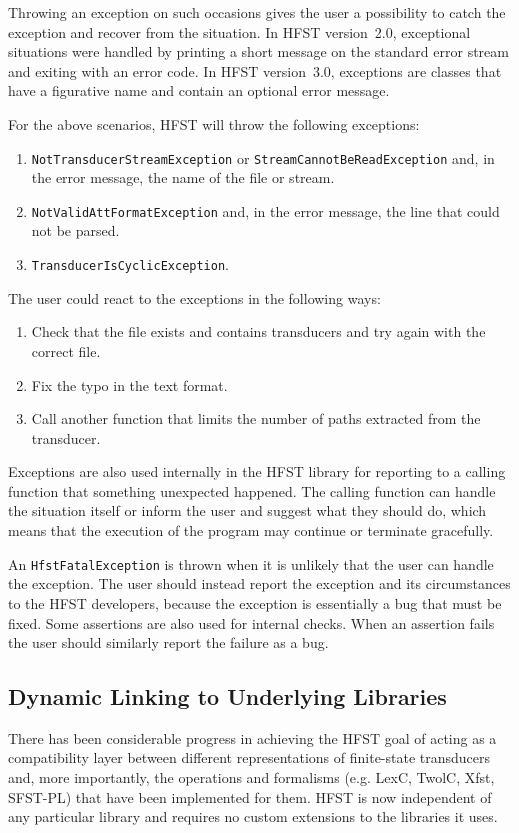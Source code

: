 \documentclass{llncs}
\begin{document}
Throwing an exception on such occasions gives the user a possibility
to catch the exception and recover from the situation. In HFST version~2.0,
exceptional situations were handled by printing a short message
on the standard error stream and exiting with an error code. In HFST version~3.0, 
exceptions are classes that have a figurative name and contain an 
optional error message.

For the above scenarios, HFST will throw the following exceptions:

\begin{enumerate} 
\item \texttt{NotTransducerStreamException} or 
\texttt{StreamCannotBeReadException} and, in the error message,
the name of the file or stream.
\item \texttt{NotValidAttFormatException} and, in the error message, 
the line that could not be parsed.
\item \texttt{TransducerIsCyclicException}.
\end{enumerate} 

The user could react to the exceptions in the following ways:

\begin{enumerate} 
\item Check that the file exists and contains transducers and try again
with the correct file.
\item Fix the typo in the text format.
\item Call another function that limits the number of paths extracted
from the transducer.
\end{enumerate} 

Exceptions are also used internally in the HFST library for reporting to a 
calling function that something unexpected happened. The calling
function can handle the situation itself or inform the user and suggest
what they should do, which means that the execution of the program 
may continue or terminate gracefully.

An \texttt{HfstFatalException} is thrown when it is unlikely that the user
can handle the exception. The user should instead report the exception
and its circumstances to the HFST developers, because the exception
is essentially a bug that must be fixed. Some assertions are also
used for internal checks. When an assertion fails the user should similarly
report the failure as a bug.

\subsection{Dynamic Linking to Underlying Libraries}
There has been considerable progress in achieving the HFST goal of acting as a
compatibility layer between different representations of finite-state
transducers and, more importantly, the operations and formalisms (e.g.
LexC, TwolC, Xfst, SFST-PL) that have been implemented
for them. HFST is now independent of any particular library and requires no
custom extensions to the libraries it uses.
\end{document}
